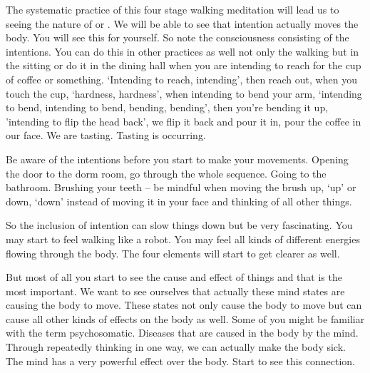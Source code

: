 \documentclass[letterpaper,10pt,english]{sphinxmanual}
\begin{document}
\sphinxAtStartPar
The systematic practice of this four stage walking meditation will lead
us to seeing the nature of
or
. We will be able to see that intention actually moves the body.
You will see this for yourself. So note the consciousness consisting of the
  intentions. You can do this in other practices as well not only the walking but
in the sitting or do it in the dining hall when you are intending to reach for
the cup of coffee or something. ‘Intending to reach, intending’, then reach
out, when you touch the cup, ‘hardness, hardness’, when intending to bend
your  arm,  ‘intending  to  bend,  intending  to  bend,  bending,  bending’,  then
you’re bending it up, ’intending to flip the head back’, we flip it back and
pour it in, pour the coffee in our face. We are tasting. Tasting is occurring.

\sphinxAtStartPar
Be aware of the intentions before you start to make your movements.
Opening the door to the dorm room, go through the whole sequence. Going
to the bathroom. Brushing your teeth – be mindful when moving the brush
up, ‘up’ or down, ‘down’ instead of moving it in your face and thinking of
all other things.

\sphinxAtStartPar
So the inclusion of intention can slow things down but be very fascinating. You may start to feel walking like a robot. You may feel all kinds of
different energies flowing through the body. The four elements will start to
get clearer as well.

\sphinxAtStartPar
But most of all you start to see the cause and effect of things and that is
the most important. We want to see ourselves that actually these mind states
are causing the body to move. These states not only cause the body to move
but can cause all other kinds of effects on the body as well. Some of you
might be familiar with the term psycho\sphinxhyphen{}somatic. Diseases that are caused in
the body by the mind. Through repeatedly thinking in one way, we can actually make the body sick. The mind has a very powerful effect over the body.
Start to see this connection.
\end{document}
